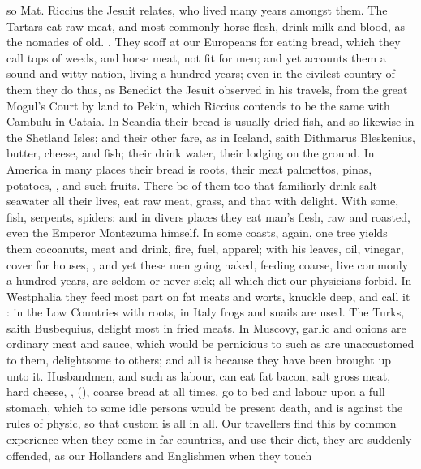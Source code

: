 so Mat. Riccius the Jesuit relates, who lived many years
amongst them. The Tartars eat raw meat, and most commonly
horse-flesh, drink milk and blood, as the nomades of old.
. They scoff at our Europeans
for eating bread, which they call tops of weeds, and horse meat, not fit for
men; and yet \Scaliger{} accounts them a sound and witty nation, living a hundred
years; even in the civilest country of them they do thus, as Benedict the
Jesuit observed in his travels, from the great Mogul's Court by land to Pekin,
which Riccius contends to be the same with Cambulu in Cataia. In Scandia their
bread is usually dried fish, and so likewise in the Shetland Isles; and their
other fare, as in Iceland, saith Dithmarus Bleskenius,
butter, cheese, and fish; their drink water, their lodging on the ground. In
America in many places their bread is roots, their meat palmettos, pinas,
potatoes, \etc{}, and such fruits. There be of them too that familiarly drink
salt seawater all their lives, eat
raw meat, grass, and that with delight. With some, fish,
serpents, spiders: and in divers places they eat man's
flesh, raw and roasted, even the Emperor Montezuma
himself. In some coasts, again, one tree yields them
cocoanuts, meat and drink, fire, fuel, apparel; with his leaves, oil, vinegar,
cover for houses, \etc{}, and yet these men going naked, feeding coarse, live
commonly a hundred years, are seldom or never sick; all which diet our
physicians forbid. In Westphalia they feed most part on fat meats and worts,
knuckle deep, and call it : in the Low
Countries with roots, in Italy frogs and snails are used. The Turks, saith
Busbequius, delight most in fried meats. In Muscovy, garlic and onions are
ordinary meat and sauce, which would be pernicious to such as are unaccustomed
to them, delightsome to others; and all is because they
have been brought up unto it. Husbandmen, and such as labour, can eat fat
bacon, salt gross meat, hard cheese, \etc{}, (),
coarse bread at all times, go to bed and labour upon a full stomach, which to
some idle persons would be present death, and is against the rules of physic,
so that custom is all in all. Our travellers find this by common experience
when they come in far countries, and use their diet, they are suddenly
offended, as our Hollanders and Englishmen when they touch
